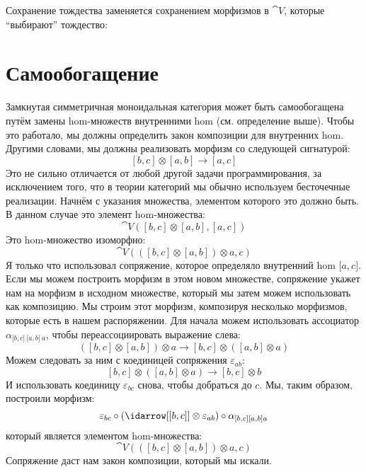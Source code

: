 \begin{figure}[H]
  \centering
\end{figure}

\noindent
Сохранение тождества заменяется сохранением
морфизмов в $\cat{V}$, которые ``выбирают'' тождество:

\begin{figure}[H]
  \centering
\end{figure}

\section{Самообогащение}

Замкнутая симметричная моноидальная категория может быть самообогащена путём замены
hom-множеств внутренними hom (см. определение выше). Чтобы это
работало, мы должны определить закон композиции для внутренних hom. Другими
словами, мы должны реализовать морфизм со следующей сигнатурой:
\[[b, c] \otimes [a, b] \to [a, c]\]
Это не сильно отличается от любой другой задачи программирования, за исключением того, что
в теории категорий мы обычно используем бесточечные реализации. Начнём
с указания множества, элементом которого это должно быть. В данном случае
это элемент hom-множества:
\[\cat{V}([b, c] \otimes [a, b], [a, c])\]
Это hom-множество изоморфно:
\[\cat{V}(([b, c] \otimes [a, b]) \otimes a, c)\]
Я только что использовал сопряжение, которое определяло внутренний hom
${[}a, c{]}$. Если мы можем построить морфизм в этом новом множестве,
сопряжение укажет нам на морфизм в исходном множестве, который мы
затем можем использовать как композицию. Мы строим этот морфизм, композируя
несколько морфизмов, которые есть в нашем распоряжении. Для начала можем использовать
ассоциатор $\alpha_{{[}b, c{]}\ {[}a, b{]}\ a}$, чтобы переассоциировать
выражение слева:
\[([b, c] \otimes [a, b]) \otimes a \to [b, c] \otimes ([a, b] \otimes a)\]
Можем следовать за ним с коединицей сопряжения $\varepsilon_{a b}$:
\[[b, c] \otimes ([a, b] \otimes a) \to [b, c] \otimes b\]
И использовать коединицу $\varepsilon_{b c}$ снова, чтобы добраться до $c$. Мы, таким образом,
построили морфизм:
\[\varepsilon_{b c} \circ (\idarrow[{[b, c]}] \otimes \varepsilon_{a b}) \circ \alpha_{[b, c] [a, b] a}\]
который является элементом hom-множества:
\[\cat{V}(([b, c] \otimes [a, b]) \otimes a, c)\]
Сопряжение даст нам закон композиции, который мы искали.

